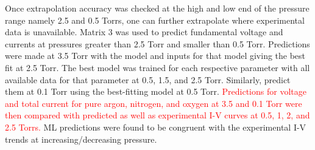 \documentclass[12pt]{iopart}
\begin{document}


Once extrapolation accuracy was checked at the high and low end of the pressure range namely 2.5 and 0.5 Torrs, one can further extrapolate where experimental data is unavailable. Matrix 3 was used to predict fundamental voltage and currents at pressures greater than 2.5 Torr and smaller than 0.5 Torr. Predictions were made at 3.5 Torr with the model and inputs for that model giving the best fit at 2.5 Torr. The best model was trained for each respective parameter with all available data for that parameter at 0.5, 1.5, and 2.5 Torr. Similarly, predict them at 0.1 Torr using the best-fitting model at 0.5 Torr. \textcolor{red}{ Predictions for voltage and total current for pure argon, nitrogen, and oxygen at 3.5 and 0.1 Torr were then compared with predicted as well as experimental I-V curves at 0.5, 1, 2, and 2.5 Torrs.} ML predictions were found to be congruent with the experimental I-V trends at increasing/decreasing pressure.
\end{document}
